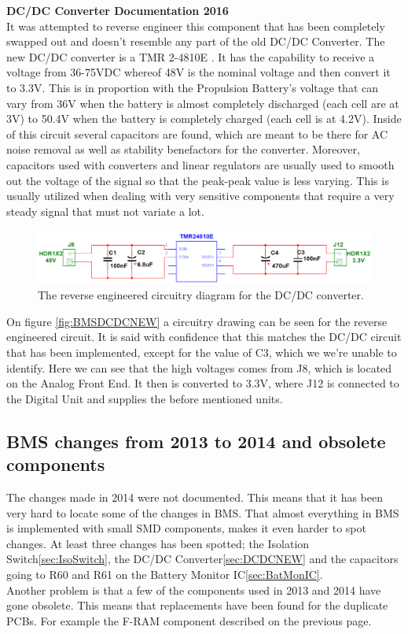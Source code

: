 \textbf{DC/DC Converter Documentation 2016}\\
It was attempted to reverse engineer this component that has been completely swapped out and doesn't resemble any part of the old DC/DC Converter. The new DC/DC converter is a TMR 2-4810E \cite{BMSDCDC}. It has the capability to receive a voltage from 36-75VDC whereof 48V is the nominal voltage and then convert it to 3.3V. This is in proportion with the Propulsion Battery's voltage that can vary from 36V when the battery is almost completely discharged (each cell are at 3V) to 50.4V when the battery is completely charged (each cell is at 4.2V). Inside of this circuit several capacitors are found, which are meant to be there for AC noise removal as well as stability benefactors for the converter. Moreover, capacitors used with converters and linear regulators are usually used to smooth out the voltage of the signal so that the peak-peak value is less varying. This is usually utilized when dealing with very sensitive components that require a very steady signal that must not variate a lot. 

\begin{figure}[H]
	\centering
	\includegraphics[width=1.0\linewidth]{Hardware/Pictures/BMSDCDCNEW}
	\caption[Empty]{The reverse engineered circuitry diagram for the DC/DC converter.}
	\label{fig:BMSDCDCNEW}
\end{figure}

On figure \vref{fig:BMSDCDCNEW} a circuitry drawing can be seen for the reverse engineered circuit. It is said with confidence that this matches the DC/DC circuit that has been implemented, except for the value of C3, which we we're unable to identify. Here we can see that the high voltages comes from J8, which is located on the Analog Front End. It then is converted to 3.3V, where J12 is connected to the Digital Unit and supplies the before mentioned units.

\subsection{BMS changes from 2013 to 2014 and obsolete components}
The changes made in 2014 were not documented. This means that it has been very hard to locate some of the changes in BMS. That almost everything in BMS is implemented with small SMD components, makes it even harder to spot changes. At least three changes has been spotted; the Isolation Switch\vref{sec:IsoSwitch}, the DC/DC Converter\vref{sec:DCDCNEW} and the capacitors going to R60 and R61 on the Battery Monitor IC\vref{sec:BatMonIC}.\\
Another problem is that a few of the components used in 2013 and 2014 have gone obsolete. This means that replacements have been found for the duplicate PCBs. For example the F-RAM component described on the previous page.

